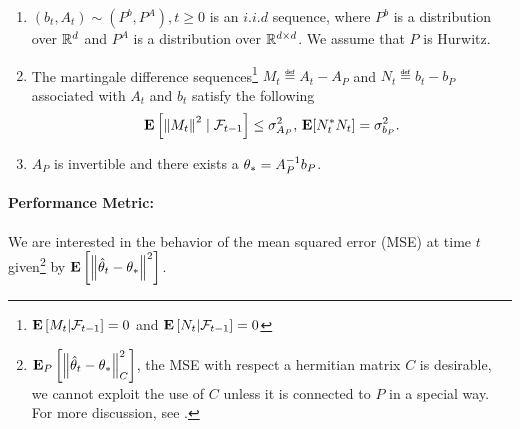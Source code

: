 \begin{assumption}\label{assmp:lsa}
\begin{enumerate}[leftmargin=*, before = \leavevmode\vspace{-\baselineskip}]
\item \label{dist} $(b_t, A_t)\sim (P^b,P^A), t\geq 0$ is an $i.i.d$ sequence, where $P^b$ is a distribution over $\mathbb{R}^d$ and $P^A$ is a distribution over $\mathbb{R}^{d \times d}$. We assume that $P$ is Hurwitz.
\item \label{matvar} The martingale difference sequences\footnote{$\mathbf{E}\left[M_t|\mathcal{F}_{t-1}\right]=0$ and $\mathbf{E}\left[N_t|\mathcal{F}_{t-1}\right]=0$} $M_t\eqdef A_t-A_{P}$ and $N_t\eqdef b_t-b_{P}$ associated with $A_t$ and $b_t$ satisfy the following
\begin{align*}\mathbf{E}\left[ \left\| M_t\right\|^2\mid\mathcal{F}_{t-1}\right]\leq \sigma^2_{A_P}, \, \mathbf{E}[N_t^* N_t]=\sigma^2_{b_P}.\end{align*}
\item $A_P$ is invertible and there exists a $\theta_*=A^{-1}_Pb_P$.
\end{enumerate}
\end{assumption}
\paragraph{Performance Metric:}  We are interested in the behavior of the mean squared error (MSE) at time $t$ given\footnote{ $\mathbf{E}_P\left[\left\| \hat{\theta}_t-\theta_*\right\|_C^2\right]$, the MSE with respect a hermitian matrix $C$ is desirable, we cannot exploit the use of $C$ unless it is connected to $P$ in a special way. For more discussion, see .}
 by $\mathbf{E}\left[\left\| \hat{\theta}_t-\theta_*\right\|^2\right]$.
\begin{comment}
\footnote{We note here that $\EE{P\norm{\thh_t-\ts}_C^2}$ which measures the MSE in the quadratic norm with respect to a positive definite matrix $C\succ 0$. However, unless $C$ has some special structure, it is not possible to exploit this generality in our bounds. Further, when data is bounded $\norm{C}^2$ is also bounded and it is straightforward to see that $\EEP{\norm{\thh_t-\ts}}^2_C\leq \norm{C}^2\EEP{\norm{\thh_t-\ts}^2}$. So, for the purpose of stating our results we will not use the general quadratic norm, however, will use it when we discuss the work by \cite{bach} in the linear regression setting, where its usage is relevant.}
\end{comment}
{}
